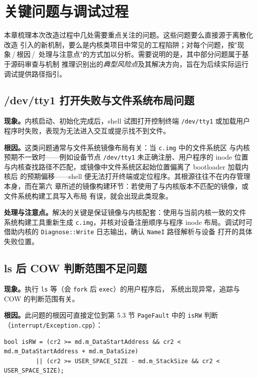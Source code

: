 \chapter{关键问题与调试过程}

本章梳理本次改造过程中几处需要重点关注的问题。这些问题要么直接源于离散化改造
引入的新机制，要么是内核类项目中常见的工程陷阱；对每个问题，按"现象\,/\,根因\,/\,
处理与注意点"的方式加以分析。需要说明的是，其中部分问题属于基于源码审查与机制
推理识别出的\emph{典型风险点}及其解决方向，旨在为后续实际运行调试提供路径指引。

\section{/dev/tty1 打开失败与文件系统布局问题}
\textbf{现象。}内核启动、初始化完成后，shell 试图打开控制终端 \texttt{/dev/tty1}
或加载用户程序时失败，表现为无法进入交互或提示找不到文件。

\textbf{根因。}这类问题通常与文件系统镜像布局有关：当 \texttt{c.img} 中的文件系统区
与内核预期不一致时——例如设备节点 \texttt{/dev/tty1} 未正确注册、用户程序的 inode
位置与内核查找路径不匹配，或镜像中文件系统区起始位置偏离了 bootloader 加载内核后
的预期偏移——shell 便无法打开终端或定位程序。其根源往往不在内存管理本身，而在第六
章所述的镜像构建环节：若使用了与内核版本不匹配的镜像，或文件系统构建工具写入布局
有误，就会出现此类现象。

\textbf{处理与注意点。}解决的关键是保证镜像与内核配套：使用与当前内核一致的文件
系统构建工具重新生成 \texttt{c.img}，并核对设备注册顺序与程序 inode 布局。调试时可
借助内核的 \texttt{Diagnose::Write} 日志输出，确认 \texttt{NameI} 路径解析与设备
打开的具体失败位置。

\section{ls 后 COW 判断范围不足问题}
\textbf{现象。}执行 \texttt{ls} 等（会 \texttt{fork} 后 \texttt{exec}）的用户程序后，
系统出现异常，追踪与 COW 的判断范围有关。

\textbf{根因。}此问题的根因可直接定位到第 5.3 节 \texttt{PageFault} 中的
\texttt{isRW} 判断（\texttt{interrupt/Exception.cpp}）：

\begin{lstlisting}[caption={COW 触发条件中的地址范围判断},label={lst:isrw}]
bool isRW = (cr2 >= md.m_DataStartAddress && cr2 < md.m_DataStartAddress + md.m_DataSize)
         || (cr2 >= USER_SPACE_SIZE - md.m_StackSize && cr2 < USER_SPACE_SIZE);
\end{lstlisting}

